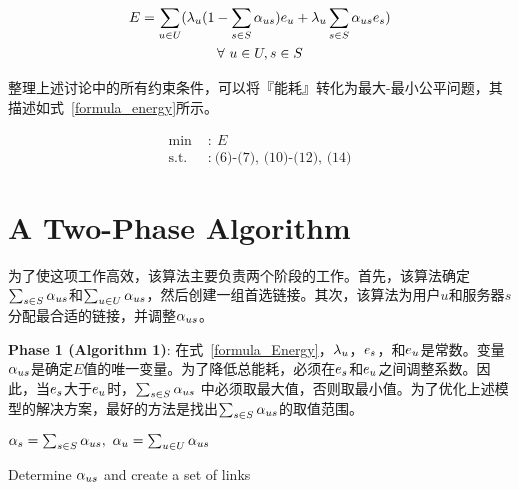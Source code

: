 \begin{equation}
\label{formula_Energy}
\begin{gathered}
E = \sum\limits_{u\in U}({\lambda}_{u}(1-\sum\limits_{s\in S}{\alpha}_{us})e_u + {\lambda}_{u}\sum\limits_{s\in S}{\alpha}_{us}e_s)\\
\forall\ u \in U, s \in S\\
\end{gathered}
\end{equation}

整理上述讨论中的所有约束条件，可以将『能耗』转化为最大-最小公平问题，其描述如式~\eqref{formula_energy}所示。

\begin{equation}
\label{formula_energy}
\begin{aligned}
\text{min }&{:}\ E\\
\text{s.t. }&{:}\ \text{(6)-(7), (10)-(12), (14)}
\end{aligned}
\end{equation}

\section{A Two-Phase Algorithm}

为了使这项工作高效，该算法主要负责两个阶段的工作。首先，该算法确定$\sum_{s \in S}{\alpha}_{us}$和$\sum_{u \in U}{\alpha}_{us}$，然后创建一组首选链接。其次，该算法为用户$u$和服务器$s$分配最合适的链接，并调整${\alpha}_{us}$。

\textbf{Phase 1 (Algorithm 1)}:
在式~\eqref{formula_Energy}，${\lambda}_{u}$，$e_s$，和$e_u$是常数。变量${\alpha}_{us}$是确定$E$值的唯一变量。为了降低总能耗，必须在$e_s$和$e_u$之间调整系数。因此，当$e_s$大于$e_u$时，$\sum_{s \in S}{{\alpha}_{us}}$ 中必须取最大值，否则取最小值。为了优化上述模型的解决方案，最好的方法是找出$\sum_{s \in S}{\alpha}_{us}$的取值范围。

\begin{algorithm}[h]
\setstretch{\algostretch}
${\alpha}_{s} = \sum_{s \in S}{\alpha}_{us}, \  {\alpha}_{u} = \sum_{u \in U}{\alpha}_{us}$\\
\caption{Determine ${\alpha}_{us}$ and create a set of links}
\label{algo_aus}
\end{algorithm}

